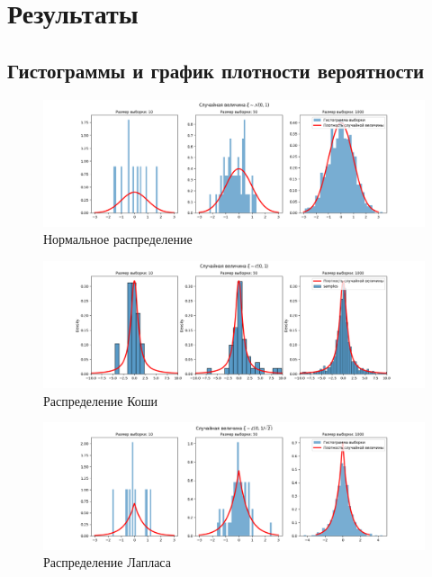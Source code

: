 \documentclass[12pt]{article}
\begin{document}
\section{Результаты}
\subsection{Гистограммы и график плотности вероятности}

\begin{figure}[!hbt]
  \centering
  \includegraphics[width=0.8\paperwidth ]{images/histogram/normal.png}
  \centering
      \caption{Нормальное распределение}
\end{figure}

\begin{figure}[!hbt]
  \centering
  \includegraphics[width=0.8\paperwidth ]{images/histogram/cauchy.png}
  \caption{Распределение Коши}
\end{figure}

\begin{figure}[!hbt]
  \centering
  \includegraphics[width=0.8\paperwidth ]{images/histogram/laplace.png}
  \caption{Распределение Лапласа}
\end{figure}
\end{document}
